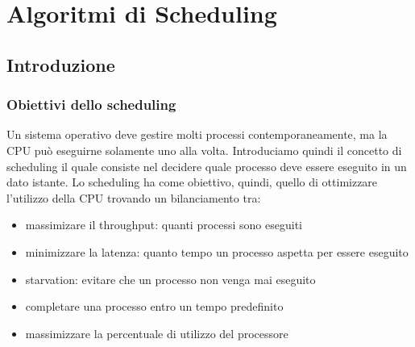 \section{Algoritmi di Scheduling}
\subsection{Introduzione}
\subsubsection{Obiettivi dello scheduling}
Un sistema operativo deve gestire molti processi contemporaneamente, ma la CPU può eseguirne solamente uno alla volta. Introduciamo quindi il concetto di scheduling il quale consiste nel decidere quale processo deve essere eseguito in un dato istante. Lo scheduling ha come obiettivo, quindi, quello di ottimizzare l'utilizzo della CPU trovando un bilanciamento tra:
\begin{itemize}
    \item massimizare il throughput: quanti processi sono eseguiti
    \item minimizzare la latenza: quanto tempo un processo aspetta per essere eseguito
    \item starvation: evitare che un processo non venga mai eseguito
    \item completare una processo entro un tempo predefinito
    \item massimizzare la percentuale di utilizzo del processore
\end{itemize}
